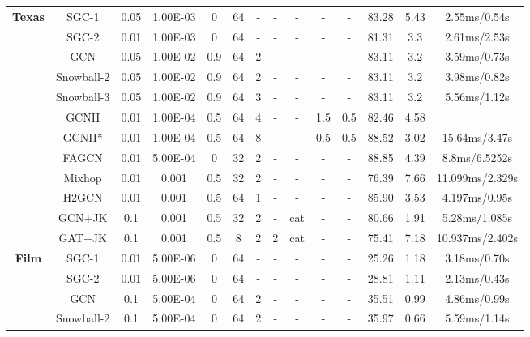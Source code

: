 \documentclass{article}
\newcommand{\0}{{\boldsymbol{0}}}
\newcommand{\6}{{\partial}}
\newcommand{\8}{{\infty}}
\newcommand{\4}{{\nabla}}
\begin{document}
\begin{table}[htbp]
{\begin{tabular}{c|c|cccccccccccc}
          \midrule
    \multirow{12}[0]{*}{\textbf{Texas}} & SGC-1 & 0.05  & 1.00E-03 & 0     & 64    & -     & -     & -     & -     & -     & 83.28 & 5.43  &  2.55ms/0.54s \\
          & SGC-2 & 0.01  & 1.00E-03 & 0     & 64    & -     & -     & -     & -     & -     & 81.31 & 3.3   & 2.61ms/2.53s \\
          & GCN   & 0.05  & 1.00E-02 & 0.9   & 64    & 2     & -     & -     & -     & -     & 83.11 & 3.2   & 3.59ms/0.73s \\
          & Snowball-2 & 0.05  & 1.00E-02 & 0.9   & 64    & 2     & -     & -     & -     & -     & 83.11 & 3.2   & 3.98ms/0.82s \\
          & Snowball-3 & 0.05  & 1.00E-02 & 0.9   & 64    & 3     & -     & -     & -     & -     & 83.11 & 3.2   & 5.56ms/1.12s \\
          & GCNII & 0.01  & 1.00E-04 & 0.5   & 64    & 4     & -     & -     & 1.5   & 0.5   & 82.46 & 4.58  &  \\
          & GCNII* & 0.01  & 1.00E-04 & 0.5   & 64    & 8     & -     & -     & 0.5   & 0.5   & 88.52 & 3.02  & 15.64ms/3.47s \\
          & FAGCN & 0.01  & 5.00E-04 & 0     & 32    & 2     & -     & -     & -     & -     & 88.85 & 4.39  & 8.8ms/6.5252s \\
          &  Mixhop & 0.01  & 0.001 & 0.5   & 32    & 2     & - & - & - & - & 76.39 & 7.66  & {11.099ms/2.329s} \\
          & H2GCN & 0.01  & 0.001 & 0.5   & 64    & 1     & - & - & - & - & 85.90 & 3.53  & {4.197ms/0.95s} \\
          & GCN+JK & 0.1   & 0.001 & 0.5   & 32    & 2     & - & {cat} & - & - & 80.66 & 1.91  & {5.28ms/1.085s} \\
          &  GAT+JK & 0.1   & 0.001 & 0.5   & 8     & 2     & 2     & {cat} & - & - & 75.41 & 7.18  & {10.937ms/2.402s} \\
          \midrule
    \multirow{12}[0]{*}{\textbf{Film}} & SGC-1 & 0.01  & 5.00E-06 & 0     & 64    & -     & -     & -     & -     & -     & 25.26 & 1.18  & 3.18ms/0.70s \\
          & SGC-2 & 0.01  & 5.00E-06 & 0     & 64    & -     & -     & -     & -     & -     & 28.81 & 1.11  &  2.13ms/0.43s \\
          & GCN   & 0.1   & 5.00E-04 & 0     & 64    & 2     & -     & -     & -     & -     & 35.51 & 0.99  & 4.86ms/0.99s \\
          & Snowball-2 & 0.1   & 5.00E-04 & 0     & 64    & 2     & -     & -     & -     & -     & 35.97 & 0.66  & 5.59ms/1.14s \\

\end{tabular}}
\end{table}
\end{document}
